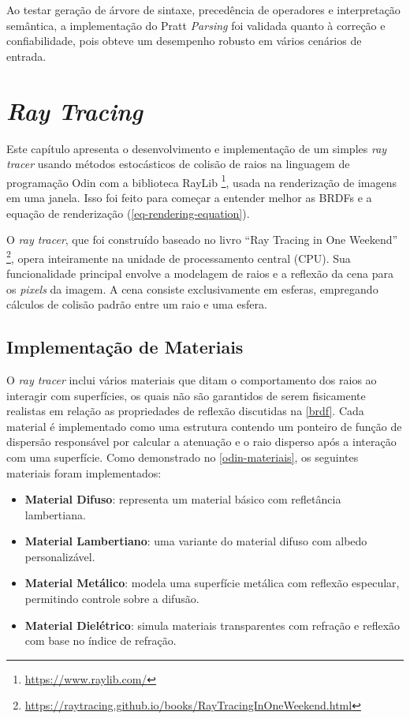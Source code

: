 \documentclass[english, 
               brazil, 
               bsc] %
               {dcomp-abntex2}
\begin{document}
Ao testar geração de árvore de sintaxe, precedência de operadores e interpretação semântica, a implementação do Pratt \textit{Parsing} foi validada quanto à correção e confiabilidade, pois obteve um desempenho robusto em vários cenários de entrada.


\section{\textit{Ray Tracing} } \label{raytracer}




Este capítulo apresenta o desenvolvimento e implementação de um simples \textit{ray tracer} usando métodos estocásticos de colisão de raios na linguagem de programação Odin com a biblioteca RayLib \footnote{\url{https://www.raylib.com/}}, usada na renderização de imagens em uma janela. Isso foi feito para começar a entender melhor as BRDFs e a equação de renderização (\autoref{eq-rendering-equation}).


O \textit{ray tracer}, que foi construído baseado no livro ``Ray Tracing in One Weekend'' \footnote{\url{https://raytracing.github.io/books/RayTracingInOneWeekend.html}}, opera inteiramente na unidade de processamento central (CPU). Sua funcionalidade principal envolve a modelagem de raios e a reflexão da cena para os \textit{pixels} da imagem. A cena consiste exclusivamente em esferas, empregando cálculos de colisão padrão entre um raio e uma esfera.


\subsection{Implementação de Materiais}


O \textit{ray tracer} inclui vários materiais que ditam o comportamento dos raios ao interagir com superfícies, os quais não são garantidos de serem fisicamente realistas em relação as propriedades de reflexão discutidas na \autoref{brdf}. Cada material é implementado como uma estrutura contendo um ponteiro de função de dispersão responsável por calcular a atenuação e o raio disperso após a interação com uma superfície. Como demonstrado no \autoref{odin-materiais}, os seguintes materiais foram implementados:


\begin{itemize}
\item \textbf{Material Difuso}: representa um material básico com refletância lambertiana.
\item \textbf{Material Lambertiano}: uma variante do material difuso com albedo personalizável.
\item \textbf{Material Metálico}: modela uma superfície metálica com reflexão especular, permitindo controle sobre a difusão.
\item \textbf{Material Dielétrico}: simula materiais transparentes com refração e reflexão com base no índice de refração.
\end{itemize}
\end{document}
